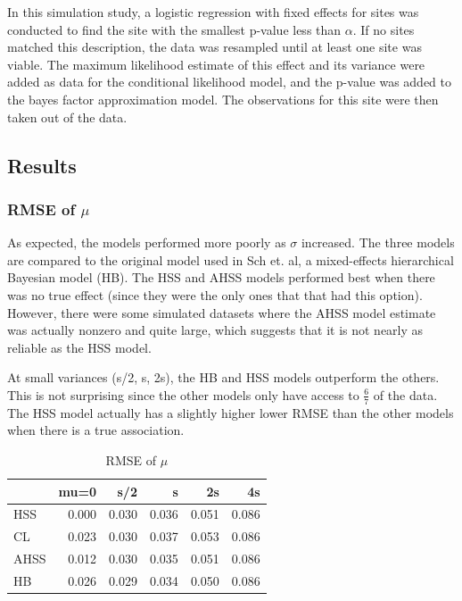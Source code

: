 \documentclass[AMA,STIX1COL]{WileyNJD-v2}\usepackage[]{graphicx}\usepackage[]{color}
\newenvironment{knitrout}{}{} %
\begin{document}
In this simulation study, a logistic regression with fixed effects for sites was conducted to find the site with the smallest p-value less than $\alpha$. If no sites matched this description, the data was resampled until at least one site was viable. The maximum likelihood estimate of this effect and its variance were added as data for the conditional likelihood model, and the p-value was added to the bayes factor approximation model.  The observations for this site were then taken out of the data.

\subsection{Results}













\subsubsection{RMSE of $\mu$}

As expected, the models performed more poorly as $\sigma$ increased. The three models are compared to the original model used in Sch et. al, a mixed-effects hierarchical Bayesian model (HB). The HSS and AHSS models performed best when there was no true effect (since they were the only ones that that had this option). However, there were some simulated datasets where the AHSS model estimate was actually nonzero and quite large, which suggests that it is not nearly as reliable as the HSS model.


At small variances (s/2, s,  2s), the HB and HSS models outperform the others. This is not surprising since the other models only have access to $\frac{6}{7}$ of the data. The HSS model actually has a slightly higher lower RMSE than the other models when there is a true association.




\begin{knitrout}
\color{fgcolor}\begin{table}

\caption{\label{tab:unnamed-chunk-18}RMSE of $\mu$}
\centering
\begin{tabular}[t]{l|r|r|r|r|r}
\hline
  & mu=0 & s/2 & s & 2s & 4s\\
\hline
HSS & 0.000 & 0.030 & 0.036 & 0.051 & 0.086\\
\hline
CL & 0.023 & 0.030 & 0.037 & 0.053 & 0.086\\
\hline
AHSS & 0.012 & 0.030 & 0.035 & 0.051 & 0.086\\
\hline
HB & 0.026 & 0.029 & 0.034 & 0.050 & 0.086\\
\hline
\end{tabular}
\end{table}


\end{knitrout}
\end{document}
